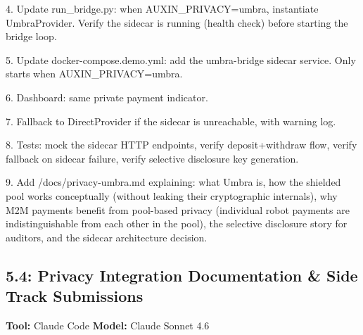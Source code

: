 \documentclass[11pt, a4paper]{article}
\begin{document}
\begin{promptbox}
4. Update run_bridge.py: when AUXIN_PRIVACY=umbra, instantiate UmbraProvider. Verify the sidecar is running (health check) before starting the bridge loop.

5. Update docker-compose.demo.yml: add the umbra-bridge sidecar service. Only starts when AUXIN_PRIVACY=umbra.

6. Dashboard: same private payment indicator.

7. Fallback to DirectProvider if the sidecar is unreachable, with warning log.

8. Tests: mock the sidecar HTTP endpoints, verify deposit+withdraw flow, verify fallback on sidecar failure, verify selective disclosure key generation.

9. Add /docs/privacy-umbra.md explaining: what Umbra is, how the shielded pool works conceptually (without leaking their cryptographic internals), why M2M payments benefit from pool-based privacy (individual robot payments are indistinguishable from each other in the pool), the selective disclosure story for auditors, and the sidecar architecture decision.
\end{promptbox}

\subsection*{5.4: Privacy Integration Documentation \& Side Track Submissions}
\textbf{Tool:} Claude Code \quad \textbf{Model:} Claude Sonnet 4.6
\end{document}
